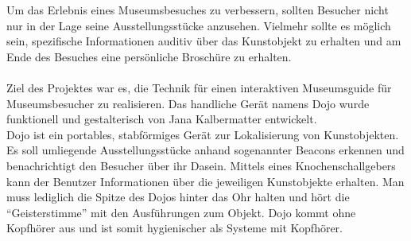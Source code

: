 Um das Erlebnis eines Museumsbesuches zu verbessern, sollten Besucher nicht nur in der Lage seine Ausstellungsstücke anzusehen. Vielmehr sollte es möglich sein, spezifische Informationen auditiv über das Kunstobjekt zu erhalten und am Ende des Besuches eine persönliche Broschüre zu erhalten.\\
\\
Ziel des Projektes war es, die Technik für einen interaktiven Museumsguide für Museumsbesucher zu realisieren. Das handliche Gerät namens Dojo wurde funktionell und gestalterisch von Jana Kalbermatter entwickelt.  \\
Dojo ist ein portables, stabförmiges Gerät zur Lokalisierung von Kunstobjekten. Es soll umliegende Ausstellungsstücke anhand sogenannter Beacons erkennen und benachrichtigt den Besucher über ihr Dasein. Mittels eines Knochenschallgebers kann der Benutzer Informationen über die jeweiligen Kunstobjekte erhalten. Man muss lediglich die Spitze des Dojos hinter das Ohr halten und hört die ``Geisterstimme'' mit den Ausführungen zum Objekt. Dojo kommt ohne Kopfhörer aus und ist somit hygienischer als Systeme mit Kopfhörer.

